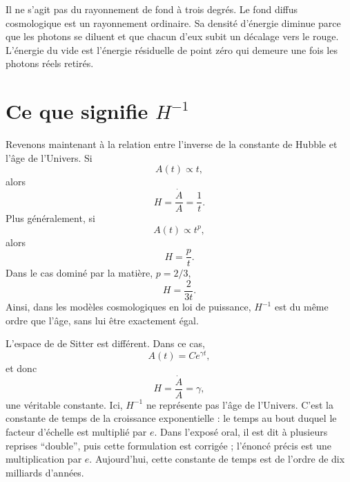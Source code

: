 Il ne s’agit pas du rayonnement de fond à trois degrés. Le fond diffus cosmologique est un rayonnement ordinaire. Sa densité d’énergie diminue parce que les photons se diluent et que chacun d’eux subit un décalage vers le rouge. L’énergie du vide est l’énergie résiduelle de point zéro qui demeure une fois les photons réels retirés.

\section{Ce que signifie \(H^{-1}\)}

Revenons maintenant à la relation entre l’inverse de la constante de Hubble et l’âge de l’Univers. Si
\begin{equation}
A(t)\propto t,
\end{equation}
alors
\begin{equation}
H=\frac{\dot A}{A}=\frac{1}{t}.
\end{equation}
Plus généralement, si
\begin{equation}
A(t)\propto t^p,
\end{equation}
alors
\begin{equation}
H=\frac{p}{t}.
\end{equation}
Dans le cas dominé par la matière, \(p=2/3\),
\begin{equation}
H=\frac{2}{3t}.
\end{equation}
Ainsi, dans les modèles cosmologiques en loi de puissance, \(H^{-1}\) est du même ordre que l’âge, sans lui être exactement égal.

L’espace de de Sitter est différent. Dans ce cas,
\begin{equation}
A(t)=C e^{\gamma t},
\end{equation}
et donc
\begin{equation}
H=\frac{\dot A}{A}=\gamma,
\end{equation}
une véritable constante. Ici, \(H^{-1}\) ne représente pas l’âge de l’Univers. C’est la constante de temps de la croissance exponentielle : le temps au bout duquel le facteur d’échelle est multiplié par \(e\). Dans l’exposé oral, il est dit à plusieurs reprises ``double'', puis cette formulation est corrigée ; l’énoncé précis est une multiplication par \(e\). Aujourd’hui, cette constante de temps est de l’ordre de dix milliards d’années.

\begin{classroomqa}
\end{classroomqa}

